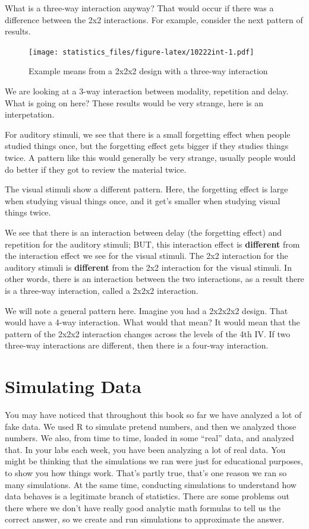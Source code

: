 \documentclass[]{book}
\begin{document}
What is a three-way interaction anyway? That would occur if there was a difference between the 2x2 interactions. For example, consider the next pattern of results.

\begin{figure}
\centering
\texttt{[image: statistics\_files/figure-latex/10222int-1.pdf]}
\caption{\label{fig:10222int}Example means from a 2x2x2 design with a three-way interaction}
\end{figure}

We are looking at a 3-way interaction between modality, repetition and delay. What is going on here? These results would be very strange, here is an interpetation.

For auditory stimuli, we see that there is a small forgetting effect when people studied things once, but the forgetting effect gets bigger if they studies things twice. A pattern like this would generally be very strange, usually people would do better if they got to review the material twice.

The visual stimuli show a different pattern. Here, the forgetting effect is large when studying visual things once, and it get's smaller when studying visual things twice.

We see that there is an interaction between delay (the forgetting effect) and repetition for the auditory stimuli; BUT, this interaction effect is \textbf{different} from the interaction effect we see for the visual stimuli. The 2x2 interaction for the auditory stimuli is \textbf{different} from the 2x2 interaction for the visual stimuli. In other words, there is an interaction between the two interactions, as a result there is a three-way interaction, called a 2x2x2 interaction.

We will note a general pattern here. Imagine you had a 2x2x2x2 design. That would have a 4-way interaction. What would that mean? It would mean that the pattern of the 2x2x2 interaction changes across the levels of the 4th IV. If two three-way interactions are different, then there is a four-way interaction.

\hypertarget{simulating-data}{%
\chapter{Simulating Data}\label{simulating-data}}

You may have noticed that throughout this book so far we have analyzed a lot of fake data. We used R to simulate pretend numbers, and then we analyzed those numbers. We also, from time to time, loaded in some ``real'' data, and analyzed that. In your labs each week, you have been analyzing a lot of real data. You might be thinking that the simulations we ran were just for educational purposes, to show you how things work. That's partly true, that's one reason we ran so many simulations. At the same time, conducting simulations to understand how data behaves is a legitimate branch of statistics. There are some problems out there where we don't have really good analytic math formulas to tell us the correct answer, so we create and run simulations to approximate the answer.
\end{document}
